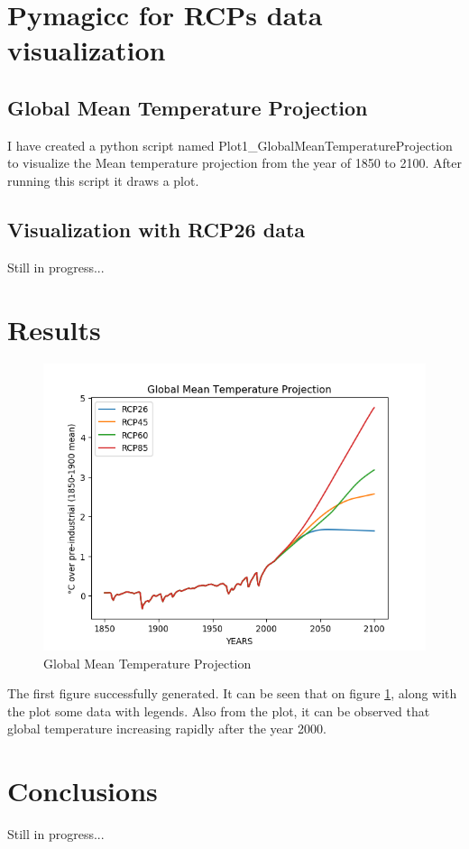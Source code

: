 \documentclass[12pt, letterpaper]{article}
\begin{document}
\section{Pymagicc for RCPs data visualization}

\subsection{Global Mean Temperature Projection}
I have created a python script named Plot1\_GlobalMeanTemperatureProjection  to visualize the Mean temperature projection from the year of 1850 to 2100. After running this script it draws a plot. 

\subsection{Visualization with RCP26 data}
Still in progress... 


\section{Results}
\begin{figure}
\includegraphics[width=1\textwidth]{Plot1_GlobalMeanTemperatureProjection.png}
\caption{Global Mean Temperature Projection}
\label{fig:Plot1_GlobalMeanTemperatureProjection}
\end{figure}

The first figure successfully generated. It can be seen that on figure \ref{fig:Plot1_GlobalMeanTemperatureProjection}, along with the plot some data with legends. Also from the plot, it can be observed that global temperature increasing rapidly after the year 2000. 






\section{Conclusions}
Still in progress...
\end{document}

